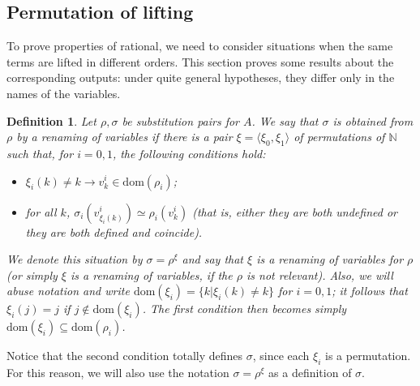 \documentclass{article}
\newtheorem{definition}{Definition}[section]
\newcommand{\tacticname}[1]{\textsf{#1}}
\newcommand{\rational}{\tacticname{rational}}
\newcommand{\nat}{{\mathbb N}}
\newcommand{\dom}{\ensuremath{\mathrm{dom}}}
\newcommand{\renamevar}[2]{\ensuremath{{#1}^{#2}}}
\newcommand{\isrenamevar}[3]{\ensuremath{{#1}=\renamevar{#2}{#3}}}
\begin{document}
\subsection{Permutation of lifting}

To prove properties of {\rational}, we need to consider situations when
the same terms are lifted in different orders.
This section proves some results about the corresponding outputs: under
quite general hypotheses, they differ only in the names of the variables.

\begin{definition}\label{renamevars}
Let $\rho,\sigma$ be substitution pairs for $A$.  We say that $\sigma$ is
obtained from $\rho$ \emph{by a renaming of variables} if there is a pair
$\xi=\langle\xi_0,\xi_1\rangle$ of permutations of $\nat$ such that,
for $i=0,1$, the following conditions hold:
\begin{itemize}
\item $\xi_i(k)\neq k\rightarrow v^i_k\in\dom(\rho_i)$;
\item for all $k$, $\sigma_i\left(v^i_{\xi_i(k)}\right)\simeq\rho_i(v^i_k)$
(that is, either they are both undefined or they are both defined and
coincide).
\end{itemize}
We denote this situation by {\isrenamevar\sigma\rho\xi} and say that $\xi$ is
a renaming of variables for $\rho$ (or simply $\xi$ is a renaming of
variables, if the $\rho$ is not relevant).
Also, we will abuse notation and write $\dom(\xi_i)=\{k|\xi_i(k)\neq k\}$
for $i=0,1$; it follows that $\xi_i(j)=j$ if $j\not\in\dom(\xi_i)$.  The
first condition then becomes simply $\dom(\xi_i)\subseteq\dom(\rho_i)$.
\end{definition}

Notice that the second condition totally defines $\sigma$, since
each $\xi_i$ is a permutation.  For this reason, we will also use the
notation {\isrenamevar\sigma\rho\xi} as a definition of $\sigma$.
\end{document}
